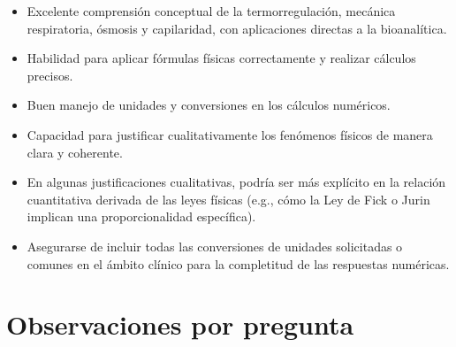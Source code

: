 \documentclass[11pt,a4paper]{article}
\begin{document}
\vspace{4pt}
\begin{minipage}[t]{0.48\linewidth}
  \begin{tcolorbox}[cajaFortaleza, title={Fortalezas}]
\begin{itemize}[leftmargin=1.5em, itemsep=2pt]
  \item Excelente comprensión conceptual de la termorregulación, mecánica respiratoria, ósmosis y capilaridad, con aplicaciones directas a la bioanalítica.
  \item Habilidad para aplicar fórmulas físicas correctamente y realizar cálculos precisos.
  \item Buen manejo de unidades y conversiones en los cálculos numéricos.
  \item Capacidad para justificar cualitativamente los fenómenos físicos de manera clara y coherente.
\end{itemize}
  \end{tcolorbox}
\end{minipage}
\hfill
\begin{minipage}[t]{0.48\linewidth}
  \begin{tcolorbox}[cajaMejora, title={Areas de mejora}]
\begin{itemize}[leftmargin=1.5em, itemsep=2pt]
  \item En algunas justificaciones cualitativas, podría ser más explícito en la relación cuantitativa derivada de las leyes físicas (e.g., cómo la Ley de Fick o Jurin implican una proporcionalidad específica).
  \item Asegurarse de incluir todas las conversiones de unidades solicitadas o comunes en el ámbito clínico para la completitud de las respuestas numéricas.
\end{itemize}
  \end{tcolorbox}
\end{minipage}

\section*{Observaciones por pregunta}
\end{document}

